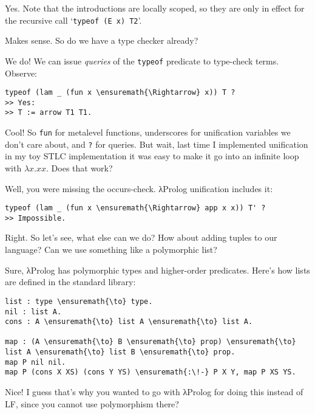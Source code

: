 \heroADVISOR{} Yes. Note that the introductions are locally scoped, so they
are only in effect for the recursive call `\texttt{typeof\ (E\ x)\ T2}'.

\heroSTUDENT{} Makes sense. So do we have a type checker already?

\heroADVISOR{} We do! We can issue \emph{queries} of the \texttt{typeof}
predicate to type-check terms. Observe:

\importantCodeblock{}

\begin{verbatim}
typeof (lam _ (fun x \ensuremath{\Rightarrow} x)) T ?
>> Yes:
>> T := arrow T1 T1.
\end{verbatim}

\importantCodeblockEnd{}

\heroSTUDENT{} Cool! So \texttt{fun} for metalevel functions, underscores for
unification variables we don't care about, and \texttt{?} for queries.
But wait, last time I implemented unification in my toy STLC
implementation it was easy to make it go into an infinite loop with
\(\lambda x. x x\). Does that work?

\heroADVISOR{} Well, you were missing the occurs-check. \foreignlanguage{greek}{λ}Prolog unification
includes it:

\begin{verbatim}
typeof (lam _ (fun x \ensuremath{\Rightarrow} app x x)) T' ?
>> Impossible.
\end{verbatim}

\heroSTUDENT{} Right. So let's see, what else can we do? How about adding
tuples to our language? Can we use something like a polymorphic list?

\heroADVISOR{} Sure, \foreignlanguage{greek}{λ}Prolog has polymorphic types and higher-order
predicates. Here's how lists are defined in the standard library:

\begin{verbatim}
list : type \ensuremath{\to} type.
nil : list A.
cons : A \ensuremath{\to} list A \ensuremath{\to} list A.

map : (A \ensuremath{\to} B \ensuremath{\to} prop) \ensuremath{\to} list A \ensuremath{\to} list B \ensuremath{\to} prop.
map P nil nil.
map P (cons X XS) (cons Y YS) \ensuremath{:\!-} P X Y, map P XS YS.
\end{verbatim}

\heroSTUDENT{} Nice! I guess that's why you wanted to go with \foreignlanguage{greek}{λ}Prolog for
doing this instead of LF, since you cannot use polymorphism there?

